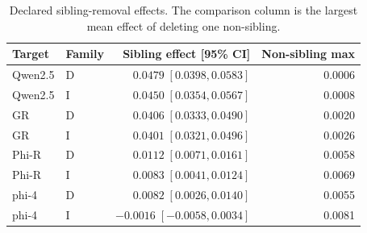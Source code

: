 \begin{table}[ht]
\caption{Declared sibling-removal effects. The comparison column is the largest mean effect of deleting one non-sibling.}
\label{tab:sibling-full}\centering\small
\begin{tabular}{llrr}\toprule
Target & Family & Sibling effect [95\% CI] & Non-sibling max\\\midrule
Qwen2.5 & D & $0.0479\;[0.0398,0.0583]$ & 0.0006\\
Qwen2.5 & I & $0.0450\;[0.0354,0.0567]$ & 0.0008\\
GR & D & $0.0406\;[0.0333,0.0490]$ & 0.0020\\
GR & I & $0.0401\;[0.0321,0.0496]$ & 0.0026\\
Phi-R & D & $0.0112\;[0.0071,0.0161]$ & 0.0058\\
Phi-R & I & $0.0083\;[0.0041,0.0124]$ & 0.0069\\
phi-4 & D & $0.0082\;[0.0026,0.0140]$ & 0.0055\\
phi-4 & I & $-0.0016\;[-0.0058,0.0034]$ & 0.0081\\
\bottomrule\end{tabular}\end{table}